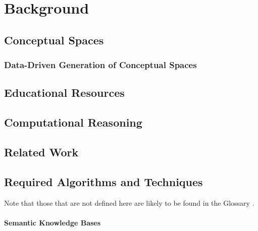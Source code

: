 \chapter{Background}


\section{Conceptual Spaces}


\subsection{Data-Driven Generation of Conceptual Spaces}


\section{Educational Resources}



\section{Computational Reasoning}


\label{sec:reasoning}

\section{Related Work}



\section{Required Algorithms and Techniques}

Note that those that are not defined here are likely to be found in the Glossary .

\subsubsection*{Semantic Knowledge Bases}

